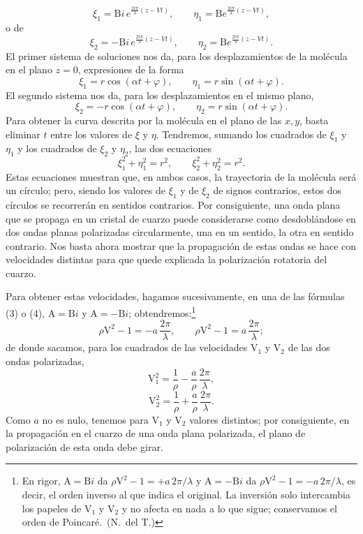 \[
\xi_1=\mathrm Bi\,e^{\frac{2i\pi}{\lambda}(z-Vt)},\qquad
\eta_1=\mathrm Be^{\frac{2i\pi}{\lambda}(z-Vt)},
\]
o de
\[
\xi_2=-\mathrm Bi\,e^{\frac{2i\pi}{\lambda}(z-Vt)},\qquad
\eta_2=\mathrm Be^{\frac{2i\pi}{\lambda}(z-Vt)}.
\]
El primer sistema de soluciones nos da, para los desplazamientos de la
molécula en el plano $z=0$, expresiones de la forma
\[
\xi_1=r\cos(\alpha t+\varphi),\qquad \eta_1=r\sin(\alpha t+\varphi).
\]
El segundo sistema nos da, para los desplazamientos en el mismo plano,
\[
\xi_2=-r\cos(\alpha t+\varphi),\qquad \eta_2=r\sin(\alpha t+\varphi).
\]
Para obtener la curva descrita por la molécula en el plano de las $x,y$,
basta eliminar $t$ entre los valores de $\xi$ y $\eta$. Tendremos, sumando
los cuadrados de $\xi_1$ y $\eta_1$ y los cuadrados de $\xi_2$ y $\eta_2$,
las dos ecuaciones
\[
\xi_1^2+\eta_1^2=r^2,\qquad \xi_2^2+\eta_2^2=r^2.
\]
Estas ecuaciones muestran que, en ambos casos, la trayectoria de la
molécula será un círculo; pero, siendo los valores de $\xi_1$ y de $\xi_2$
de signos contrarios, estos dos círculos se recorrerán en sentidos
contrarios. Por consiguiente, una onda plana que se propaga en un cristal
de cuarzo puede considerarse como desdoblándose en dos ondas planas
polarizadas circularmente, una en un sentido, la otra en sentido contrario.
Nos basta ahora mostrar que la propagación de estas ondas se hace con
velocidades distintas para que quede explicada la polarización rotatoria
del cuarzo.

Para obtener estas velocidades, hagamos sucesivamente, en una de las
fórmulas (3) o (4), $\mathrm A=\mathrm Bi$ y $\mathrm A=-\mathrm Bi$;
obtendremos:\footnote{En rigor, $\mathrm A=\mathrm Bi$ da
$\rho\mathrm V^2-1=+a\,2\pi/\lambda$ y $\mathrm A=-\mathrm Bi$ da
$\rho\mathrm V^2-1=-a\,2\pi/\lambda$, es decir, el orden inverso al que
indica el original. La inversión solo intercambia los papeles de
$\mathrm V_1$ y $\mathrm V_2$ y no afecta en nada a lo que sigue;
conservamos el orden de Poincaré.~(N.~del T.)}
\[
\rho\mathrm V^2-1=-a\,\frac{2\pi}{\lambda},\qquad
\rho\mathrm V^2-1=a\,\frac{2\pi}{\lambda};
\]
de donde sacamos, para los cuadrados de las velocidades $\mathrm V_1$ y
$\mathrm V_2$ de las dos ondas polarizadas,
\begin{equation}
\mathrm V_1^2=\frac{1}{\rho}-\frac{a}{\rho}\,\frac{2\pi}{\lambda},
\tag{5}
\end{equation}
\begin{equation}
\mathrm V_2^2=\frac{1}{\rho}+\frac{a}{\rho}\,\frac{2\pi}{\lambda}.
\tag{6}
\end{equation}
Como $a$ no es nulo, tenemos para $\mathrm V_1$ y $\mathrm V_2$ valores
distintos; por consiguiente, en la propagación en el cuarzo de una onda
plana polarizada, el plano de polarización de esta onda debe girar.

